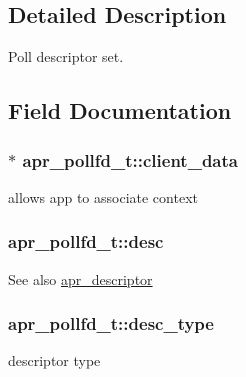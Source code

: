 \subsection{Detailed Description}
Poll descriptor set. 

\subsection{Field Documentation}
\subsubsection[{\texorpdfstring{client\+\_\+data}{client_data}}]{$\ast$ apr\+\_\+pollfd\+\_\+t\+::client\+\_\+data}\hypertarget{structapr__pollfd__t_a01220e7a71963456461baa40b2a05716}{}\label{structapr__pollfd__t_a01220e7a71963456461baa40b2a05716}
allows app to associate context 
\subsubsection[{\texorpdfstring{desc}{desc}}]{ apr\+\_\+pollfd\+\_\+t\+::desc}\hypertarget{structapr__pollfd__t_ad63baa71bb91f80513d33482e28fb967}{}\label{structapr__pollfd__t_ad63baa71bb91f80513d33482e28fb967}
\begin{DoxySeeAlso}{See also}
\hyperlink{unionapr__descriptor}{apr\+\_\+descriptor} 
\end{DoxySeeAlso}
\subsubsection[{\texorpdfstring{desc\+\_\+type}{desc_type}}]{ apr\+\_\+pollfd\+\_\+t\+::desc\+\_\+type}\hypertarget{structapr__pollfd__t_acfafd260241a874745f49ba2df246c53}{}\label{structapr__pollfd__t_acfafd260241a874745f49ba2df246c53}
descriptor type 
